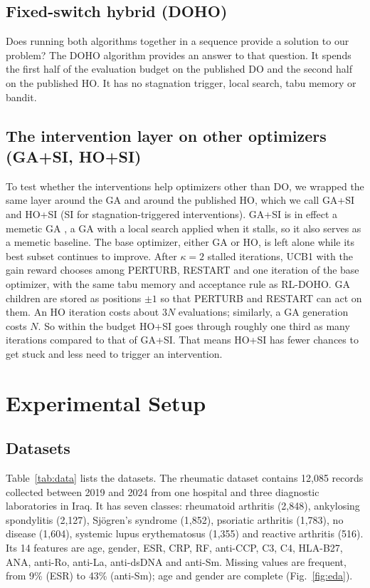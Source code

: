 \documentclass[pdflatex,sn-basic]{sn-jnl}
\begin{document}
\subsection{Fixed-switch hybrid (DOHO)}
Does running both algorithms together in a sequence provide a solution to our problem? The DOHO algorithm provides an answer to that question. It spends the first half of the evaluation budget on the published DO and the second half on the published HO. It has no stagnation trigger, local search, tabu memory or bandit.

\subsection{The intervention layer on other optimizers (GA+SI, HO+SI)}
To test whether the interventions help optimizers other than DO, we wrapped the same layer around the GA and around the published HO, which we call GA+SI and HO+SI (SI for stagnation-triggered interventions). GA+SI is in effect a memetic GA \citep{moscato1989}, a GA with a local search applied when it stalls, so it also serves as a memetic baseline. The base optimizer, either GA or HO, is left alone while its best subset continues to improve. After $\kappa=2$ stalled iterations, UCB1 with the gain reward chooses among PERTURB, RESTART and one iteration of the base optimizer, with the same tabu memory and acceptance rule as RL-DOHO. GA children are stored as positions $\pm1$ so that PERTURB and RESTART can act on them. An HO iteration costs about $3N$ evaluations; similarly, a GA generation costs $N$. So within the budget HO+SI goes through roughly one third as many iterations compared to that of GA+SI. That means HO+SI has fewer chances to get stuck and less need to trigger an intervention.



\section{Experimental Setup}\label{sec:setup}

\subsection{Datasets}
Table~\ref{tab:data} lists the datasets. The rheumatic dataset \citep{mahdi2025data} contains 12,085 records collected between 2019 and 2024 from one hospital and three diagnostic laboratories in Iraq. It has seven classes: rheumatoid arthritis (2,848), ankylosing spondylitis (2,127), Sj\"ogren's syndrome (1,852), psoriatic arthritis (1,783), no disease (1,604), systemic lupus erythematosus (1,355) and reactive arthritis (516). Its 14 features are age, gender, ESR, CRP, RF, anti-CCP, C3, C4, HLA-B27, ANA, anti-Ro, anti-La, anti-dsDNA and anti-Sm. Missing values are frequent, from 9\% (ESR) to 43\% (anti-Sm); age and gender are complete (Fig.~\ref{fig:eda}).
\end{document}
